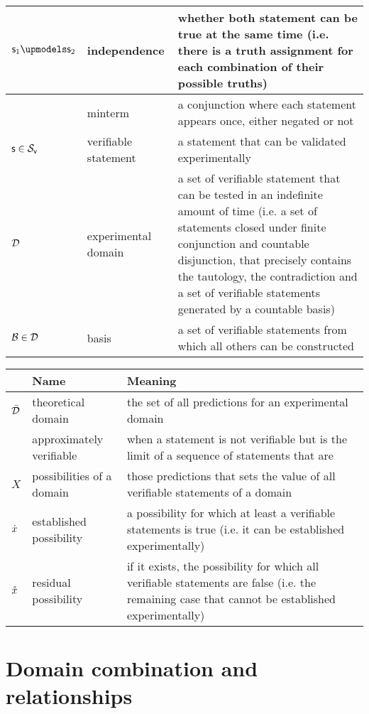 \documentclass[11pt,letterpaper,fleqn]{memoir} %
\begin{document}
\begin{tabular}{p{} p{} p{}}
	\hline 
	$\stmt_1 \indep \stmt_2$ & independence & whether both statement can be true at the same time (i.e. there is a truth assignment for each combination of their possible truths) \\
	\hline 
	& minterm & a conjunction where each statement appears once, either negated or not \\
	\hline 
	$\mathsf{s} \in \mathcal{S}_\textsf{v}$ & verifiable statement & a statement that can be validated experimentally\\ 
	\hline 
	$\mathcal{D}$ & experimental domain & a set of verifiable statement that can be tested in an indefinite amount of time (i.e. a set of statements closed under finite conjunction and countable disjunction, that precisely contains the tautology, the contradiction and a set of verifiable statements generated by a countable basis) \\ 
	\hline 
	$\mathcal{B} \in \mathcal{D}$ & basis & a set of verifiable statements from which all others can be constructed\\ 
			
\end{tabular} 

\newpage

\begin{tabular}{p{} p{} p{}}
	& Name & Meaning  \\ 
	\hline 
	$\bar{\mathcal{D}}$ & theoretical domain & the set of all predictions for an experimental domain\\ 
	\hline 
	& approximately verifiable & when a statement is not verifiable but is the limit of a sequence of statements that are\\ 
	\hline 
	$X$ & possibilities of a domain & those predictions that sets the value of all verifiable statements of a domain\\ 
	\hline 
	$\dot{x}$ & established possibility & a possibility for which at least a verifiable statements is true (i.e. it can be established experimentally)\\ 
	\hline 
	$\mathring{x}$ & residual possibility & if it exists, the possibility for which all verifiable statements are false (i.e. the remaining case that cannot be established experimentally)\\ 
	
\end{tabular} 


\chapter{Domain combination and relationships}
\end{document}
